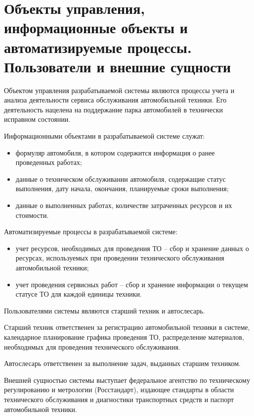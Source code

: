 \section{Объекты управления, информационные объекты и автоматизируемые процессы.
  Пользователи и внешние сущности}
Объектом управления разрабатываемой системы являются процессы учета и анализа
деятельности сервиса обслуживания автомобильной техники.
Его деятельность нацелена на поддержание парка автомобилей в технически
исправном состоянии.

Информационными объектами в разрабатываемой системе служат:
\begin{itemize}
	\item формуляр автомобиля, в котором содержится информация о ранее
        проведенных работах;
	\item данные о техническом обслуживании автомобиля, содержащие статус
        выполнения, дату начала, окончания, планируемые сроки выполнения;
	\item данные о выполненных работах, количестве затраченных ресурсов и
        их стоимости.
\end{itemize}

Автоматизируемые процессы в разрабатываемой системе:
\begin{itemize}

	\item учет ресурсов, необходимых для проведения ТО -- сбор и хранение данных
		о ресурсах, используемых при проведении технического обслуживания
        автомобильной техники;

    \item учет проведения сервисных работ -- сбор и хранение информации о
        текущем статусе ТО для каждой единицы техники.

\end{itemize}

Пользователями системы являются старший техник и автослесарь.

Старший техник ответственен за регистрацию автомобильной техники в системе,
календарное планирование графика проведения ТО, распределение материалов,
необходимых для проведения технического обслуживания.

Автослесарь ответственен за выполнение задач, выданных старшим техником.

Внешней сущностью системы выступает федеральное агентство по техническому
регулированию и метрологии (Росстандарт), издающее стандарты в области
технического обслуживания и диагностики транспортных средств и паспорт
автомобильной техники.
